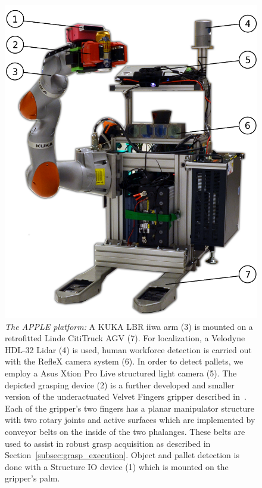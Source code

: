 \begin{figure}[t!]
\begin{center}
\includegraphics[width =0.85\linewidth]{figs/apple_demonstrator}
\caption{\textit{The APPLE platform:} A KUKA LBR iiwa arm (3) is mounted on a retrofitted Linde
  CitiTruck AGV (7). For localization, a Velodyne HDL-32 Lidar (4) is used, human workforce detection
  is carried out with the RefleX camera system (6). In order to detect pallets, we employ a Asus
  Xtion Pro Live structured light camera (5). The depicted grasping device (2) is a further
  developed and smaller version of the underactuated Velvet Fingers gripper described
  in~\cite{Tinc12}. Each of the gripper’s two fingers has a planar manipulator structure with two
  rotary joints and active surfaces which are implemented by conveyor belts on the inside of the two
  phalanges. These belts are used to assist in robust grasp acquisition as described in
  Section~\ref{subsec:grasp_execution}. Object and pallet detection is done with a Structure IO
  device (1) which is mounted on the gripper's palm.}
\label{fig:robot}
\vspace{-0.5cm}
\end{center}
\end{figure}


